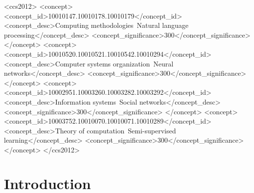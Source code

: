 \documentclass[sigconf]{acmart}
\theoremstyle{definition}
\theoremstyle{hypothesis}
\begin{document}

\begin{CCSXML}
<ccs2012>
<concept>
<concept_id>10010147.10010178.10010179</concept_id>
<concept_desc>Computing methodologies~Natural language processing</concept_desc>
<concept_significance>300</concept_significance>
</concept>
<concept>
<concept_id>10010520.10010521.10010542.10010294</concept_id>
<concept_desc>Computer systems organization~Neural networks</concept_desc>
<concept_significance>300</concept_significance>
</concept>
<concept>
<concept_id>10002951.10003260.10003282.10003292</concept_id>
<concept_desc>Information systems~Social networks</concept_desc>
<concept_significance>300</concept_significance>
</concept>
<concept>
<concept_id>10003752.10010070.10010071.10010289</concept_id>
<concept_desc>Theory of computation~Semi-supervised learning</concept_desc>
<concept_significance>300</concept_significance>
</concept>
</ccs2012>
\end{CCSXML}


\maketitle


\section{Introduction}\label{sec:introduction}
\end{document}
